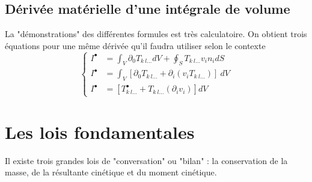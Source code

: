     \subsection{Dérivée matérielle d'une intégrale de volume}
    La "démonstrations" des différentes formules est très calculatoire. On obtient trois équations pour une
    même dérivée qu'il faudra utiliser selon le contexte
    \begin{equation}
    \left\{\begin{array}{ll}
    I^\bullet &= \int_V \partial_0 T_{k\ l\dots} dV + \oint_S T_{k\ l\dots} v_in_i dS\\
    I^\bullet &= \int_V [\partial_0T_{k\ l\dots} + \partial_i(v_iT_{k\ l\dots})]\ dV\\
    I^\bullet &= [T_{k\ l\dots}^\bullet + T_{k\ l\dots}(\partial_iv_i)]dV
    \end{array}\right.
    \end{equation}
    
    
    
\section{Les lois fondamentales}
    Il existe trois grandes lois de "conversation" ou "bilan" : la conservation de la masse, de la 
    résultante cinétique et du moment cinétique.
    
